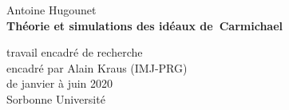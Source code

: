 \begin{center}
	\large Antoine Hugounet \\

	\vspace{30px}
	\LARGE \textbf{Théorie et simulations des idéaux de Carmichael}

	\vspace{30px}
	\large
	travail encadré de recherche \\
	encadré par Alain Kraus (IMJ-PRG) \\
	de janvier à juin 2020 \\

	\vspace{20px}
	Sorbonne Université

	\vspace{1cm}
	\begin{center}
	\end{center}

	\normalsize
	\renewcommand{\contentsname}{}
	\vspace{10px}
	\tableofcontents
\end{center}
